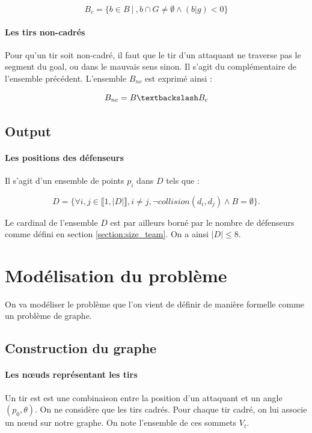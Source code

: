 \documentclass[12pt]{article}
\begin{document}
\begin{equation*}
    B_c = \{ b \in B \ | \ , b \cap G \ne \emptyset \wedge (b|g) < 0  \}
\end{equation*}


\paragraph{Les tirs non-cadrés}
Pour qu'un tir soit non-cadré, il faut que le tir d'un attaquant ne traverse pas le segment du goal, ou dans le mauvais sens sinon. Il s'agit du complémentaire de l'ensemble précédent. L'ensemble $B_{nc}$ est exprimé ainsi :

\begin{equation*}
    B_{nc} = B \textbackslash B_c
\end{equation*}

\subsection{Output}

\paragraph{Les positions des défenseurs} Il s'agit d'un ensemble de points $p_i$ dans $D$ tels que :

\begin{equation*}
D = \{ \forall i, j \in \llbracket 1, |D| \rrbracket, i \ne j, \neg collision(d_i, d_j) \wedge B = \emptyset \}.
\end{equation*}

Le cardinal de l'ensemble $D$ est par ailleurs borné par le nombre de défenseurs comme défini en section \ref{section:size_team}. On a ainsi $|D| \leqslant 8$.

\section{Modélisation du problème}

On va modéliser le problème que l'on vient de définir de manière formelle comme un problème de graphe.

\subsection{Construction du graphe}

\paragraph{Les n\oe uds représentant les tirs}
Un tir est est une combinaison entre la position d'un attaquant et un angle $(p_0, \theta)$. On ne considère que les tirs cadrés. Pour chaque tir cadré, on lui associe un n\oe ud sur notre graphe. On note l'ensemble de ces sommets $V_t$.
\end{document}
